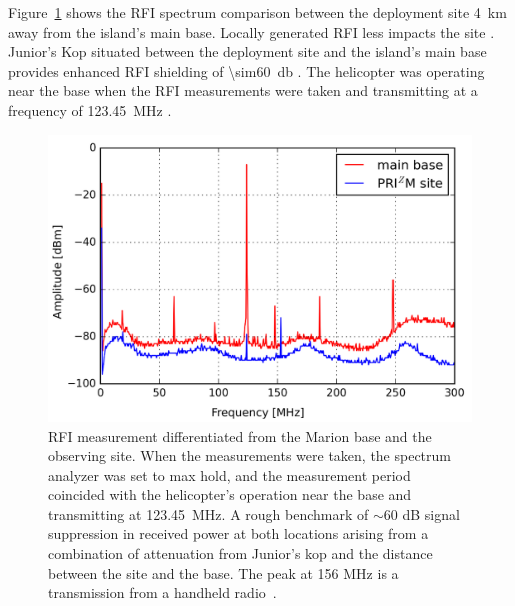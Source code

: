 Figure~\ref{fig:rfi} shows the RFI spectrum comparison between the \prizm deployment site \SI{4}{\kilo\metre} away from the island's main base. Locally generated RFI less impacts the \prizm site . Junior's Kop situated between the deployment site and the island's main base provides enhanced RFI shielding of \SI{\sim60}{\decibel} . The helicopter was operating near the base when the RFI measurements were taken and transmitting at a frequency of \SI{123.45}{\mega\hertz} .  

\begin{figure}
	\centering
	\includegraphics[width=\linewidth]{Figures/rfi}
	\caption{RFI measurement differentiated from the Marion base and the \prizm observing site. When the measurements were taken, the spectrum analyzer was set to max hold, and the measurement period coincided with the helicopter's operation near the base and transmitting at \SI{123.45}{\mega\hertz}. A rough benchmark of $\sim$60 dB signal suppression in received power at both locations arising from a combination of attenuation from Junior's kop and the distance between the \prizm site and the base. The peak at 156 MHz is a transmission from a handheld radio~\citep{2019JAI.....850004P}.}
	\label{fig:rfi}
\end{figure}

